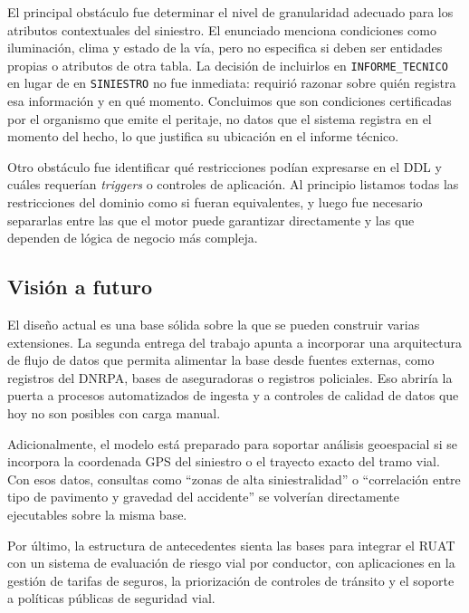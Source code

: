 \documentclass[12pt,a4paper]{article}
\begin{document}
El principal obstáculo fue determinar el nivel de granularidad adecuado para los atributos contextuales del siniestro. El enunciado menciona condiciones como iluminación, clima y estado de la vía, pero no especifica si deben ser entidades propias o atributos de otra tabla. La decisión de incluirlos en \texttt{INFORME\_TECNICO} en lugar de en \texttt{SINIESTRO} no fue inmediata: requirió razonar sobre quién registra esa información y en qué momento. Concluimos que son condiciones certificadas por el organismo que emite el peritaje, no datos que el sistema registra en el momento del hecho, lo que justifica su ubicación en el informe técnico.

Otro obstáculo fue identificar qué restricciones podían expresarse en el DDL y cuáles requerían \textit{triggers} o controles de aplicación. Al principio listamos todas las restricciones del dominio como si fueran equivalentes, y luego fue necesario separarlas entre las que el motor puede garantizar directamente y las que dependen de lógica de negocio más compleja.

\subsection*{Visión a futuro}

El diseño actual es una base sólida sobre la que se pueden construir varias extensiones. La segunda entrega del trabajo apunta a incorporar una arquitectura de flujo de datos que permita alimentar la base desde fuentes externas, como registros del DNRPA, bases de aseguradoras o registros policiales. Eso abriría la puerta a procesos automatizados de ingesta y a controles de calidad de datos que hoy no son posibles con carga manual.

Adicionalmente, el modelo está preparado para soportar análisis geoespacial si se incorpora la coordenada GPS del siniestro o el trayecto exacto del tramo vial. Con esos datos, consultas como ``zonas de alta siniestralidad'' o ``correlación entre tipo de pavimento y gravedad del accidente'' se volverían directamente ejecutables sobre la misma base.

Por último, la estructura de antecedentes sienta las bases para integrar el RUAT con un sistema de evaluación de riesgo vial por conductor, con aplicaciones en la gestión de tarifas de seguros, la priorización de controles de tránsito y el soporte a políticas públicas de seguridad vial.
\end{document}
